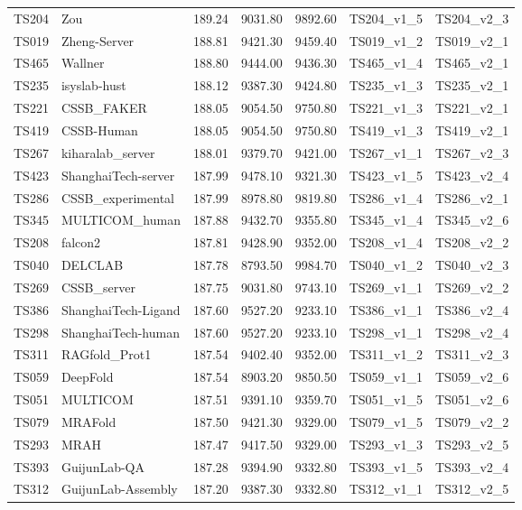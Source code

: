 \begin{table}[ht]
{\begin{tabular}{llrrrll}
TS204 & Zou & 189.24 & 9031.80 & 9892.60 & TS204\_v1\_5 & TS204\_v2\_3 \\ 
TS019 & Zheng-Server & 188.81 & 9421.30 & 9459.40 & TS019\_v1\_2 & TS019\_v2\_1 \\ 
TS465 & Wallner & 188.80 & 9444.00 & 9436.30 & TS465\_v1\_4 & TS465\_v2\_1 \\ 
TS235 & isyslab-hust & 188.12 & 9387.30 & 9424.80 & TS235\_v1\_3 & TS235\_v2\_1 \\ 
TS221 & CSSB\_FAKER & 188.05 & 9054.50 & 9750.80 & TS221\_v1\_3 & TS221\_v2\_1 \\ 
TS419 & CSSB-Human & 188.05 & 9054.50 & 9750.80 & TS419\_v1\_3 & TS419\_v2\_1 \\ 
TS267 & kiharalab\_server & 188.01 & 9379.70 & 9421.00 & TS267\_v1\_1 & TS267\_v2\_3 \\ 
TS423 & ShanghaiTech-server & 187.99 & 9478.10 & 9321.30 & TS423\_v1\_5 & TS423\_v2\_4 \\ 
TS286 & CSSB\_experimental & 187.99 & 8978.80 & 9819.80 & TS286\_v1\_4 & TS286\_v2\_1 \\ 
TS345 & MULTICOM\_human & 187.88 & 9432.70 & 9355.80 & TS345\_v1\_4 & TS345\_v2\_6 \\ 
TS208 & falcon2 & 187.81 & 9428.90 & 9352.00 & TS208\_v1\_4 & TS208\_v2\_2 \\ 
TS040 & DELCLAB & 187.78 & 8793.50 & 9984.70 & TS040\_v1\_2 & TS040\_v2\_3 \\ 
TS269 & CSSB\_server & 187.75 & 9031.80 & 9743.10 & TS269\_v1\_1 & TS269\_v2\_2 \\ 
TS386 & ShanghaiTech-Ligand & 187.60 & 9527.20 & 9233.10 & TS386\_v1\_1 & TS386\_v2\_4 \\ 
TS298 & ShanghaiTech-human & 187.60 & 9527.20 & 9233.10 & TS298\_v1\_1 & TS298\_v2\_4 \\ 
TS311 & RAGfold\_Prot1 & 187.54 & 9402.40 & 9352.00 & TS311\_v1\_2 & TS311\_v2\_3 \\ 
TS059 & DeepFold & 187.54 & 8903.20 & 9850.50 & TS059\_v1\_1 & TS059\_v2\_6 \\ 
TS051 & MULTICOM & 187.51 & 9391.10 & 9359.70 & TS051\_v1\_5 & TS051\_v2\_6 \\ 
TS079 & MRAFold & 187.50 & 9421.30 & 9329.00 & TS079\_v1\_5 & TS079\_v2\_2 \\ 
TS293 & MRAH & 187.47 & 9417.50 & 9329.00 & TS293\_v1\_3 & TS293\_v2\_5 \\ 
TS393 & GuijunLab-QA & 187.28 & 9394.90 & 9332.80 & TS393\_v1\_5 & TS393\_v2\_4 \\ 
TS312 & GuijunLab-Assembly & 187.20 & 9387.30 & 9332.80 & TS312\_v1\_1 & TS312\_v2\_5 \\ 

\end{tabular}}
\end{table}
